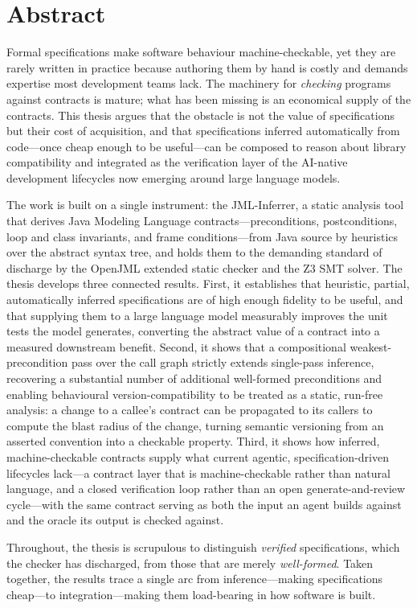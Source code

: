 \chapter*{Abstract}

Formal specifications make software behaviour machine-checkable, yet they are
rarely written in practice because authoring them by hand is costly and demands
expertise most development teams lack. The machinery for \emph{checking} programs
against contracts is mature; what has been missing is an economical supply of the
contracts. This thesis argues that the obstacle is not the value of specifications
but their cost of acquisition, and that specifications inferred automatically from
code---once cheap enough to be useful---can be composed to reason about library
compatibility and integrated as the verification layer of the AI-native
development lifecycles now emerging around large language models.

The work is built on a single instrument: the JML-Inferrer, a static analysis
tool that derives Java Modeling Language contracts---preconditions,
postconditions, loop and class invariants, and frame conditions---from Java source
by heuristics over the abstract syntax tree, and holds them to the demanding
standard of discharge by the OpenJML extended static checker and the Z3 SMT
solver. The thesis develops three connected results. First, it establishes that
heuristic, partial, automatically inferred specifications are of high enough
fidelity to be useful, and that supplying them to a large language model
measurably improves the unit tests the model generates, converting the abstract
value of a contract into a measured downstream benefit. Second, it shows that a
compositional weakest-precondition pass over the call graph strictly extends
single-pass inference, recovering a substantial number of additional well-formed
preconditions and enabling behavioural version-compatibility to be treated as a
static, run-free analysis: a change to a callee's contract can be propagated to
its callers to compute the blast radius of the change, turning semantic
versioning from an asserted convention into a checkable property. Third, it shows
how inferred, machine-checkable contracts supply what current agentic,
specification-driven lifecycles lack---a contract layer that is machine-checkable
rather than natural language, and a closed verification loop rather than an open
generate-and-review cycle---with the same contract serving as both the input an
agent builds against and the oracle its output is checked against.

Throughout, the thesis is scrupulous to distinguish \emph{verified}
specifications, which the checker has discharged, from those that are merely
\emph{well-formed}. Taken together, the results trace a single arc from
inference---making specifications cheap---to integration---making them
load-bearing in how software is built.
